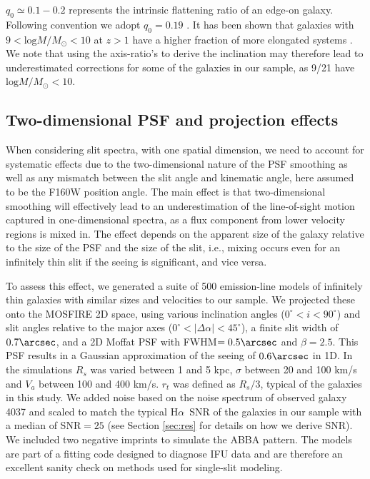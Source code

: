 \documentclass{emulateapj}
\newcommand{\ha}{H$\alpha$}
\begin{document}
$q_0\simeq0.1-0.2$ represents the intrinsic flattening ratio of an edge-on galaxy. Following convention we adopt $q_0=0.19$  \citep{Pizagno07, Haynes84}. {It has been shown that galaxies with $9<\mathrm{log}M/M_{\odot}<10$ at $z>1$ have a higher fraction of more elongated systems \citep[e.g.][]{vanderWel14b}. We note that using the axis-ratio's to derive the inclination may therefore lead to underestimated corrections for some of the galaxies in our sample, as 9/21 have $\mathrm{log}M/M_{\odot}<10$.}


\subsection{Two-dimensional PSF and projection effects}
\label{sec:smooth}

When considering slit spectra, with one spatial dimension, we need to account for systematic effects due to the two-dimensional nature of the PSF smoothing {as well as any mismatch between the slit angle and kinematic angle, here assumed to be the F160W position angle}. The main effect is that two-dimensional smoothing will effectively lead to an underestimation of the line-of-sight motion captured in one-dimensional spectra, as a flux component from lower velocity regions is mixed in. The effect depends on the apparent size of the galaxy relative to the size of the PSF and the size of the slit, i.e., mixing occurs even for an infinitely thin slit if the seeing is significant, and vice versa. 

To assess this effect, we generated a suite of 500 emission-line models \citep{Bekiaris16} of infinitely thin galaxies with similar sizes and velocities to our sample. We projected these onto the MOSFIRE 2D space, using various inclination angles ($0^{\circ}<i<90^{\circ}$) and slit angles relative to the major axes ($0^{\circ}<|\Delta \alpha|<45^{\circ}$), a finite slit width of $0.7\arcsec$, and a 2D Moffat PSF with FWHM$=0.5\arcsec$ and $\beta=2.5$. This PSF results in a Gaussian approximation of the seeing of $0.6\arcsec$ in 1D. In the simulations $R_s$ was varied between 1 and 5 kpc, $\sigma$ between 20 and 100 km/s and $V_a$ between 100 and 400 km/s. $r_t$ was defined as $R_s/3${, typical of the galaxies in this study}. We added noise based on the noise spectrum of observed galaxy 4037 and scaled to match the typical \ha\ SNR of the galaxies in our sample with a median of SNR$=25$ (see Section \ref{sec:res} for details on how we derive SNR). {We included two negative imprints to simulate the ABBA pattern.} The \citet{Bekiaris16} models are part of a fitting code designed to diagnose IFU data and are therefore an excellent sanity check on methods used for single-slit modeling. 
\end{document}
